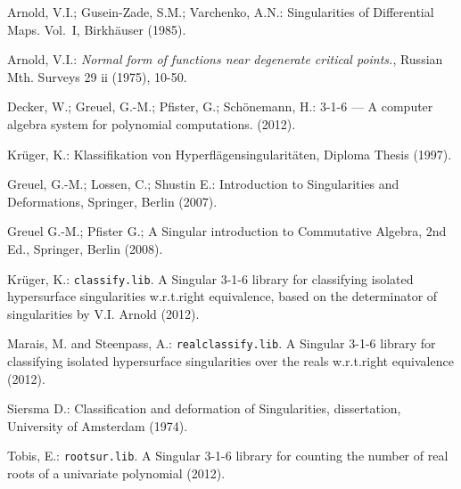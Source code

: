 \documentclass[noend]{amsproc}
\theoremstyle{definition}
\begin{document}
\begin{thebibliography}{99}

Arnold, V.I.; Gusein-Zade, S.M.; Varchenko, A.N.:
Singularities of Differential Maps. Vol.~I, Birkh\"auser (1985).

Arnold, V.I.:
\textit{Normal form of functions near degenerate critical points.},
Russian Mth. Surveys 29 ii (1975), 10-50.

Decker, W.; Greuel, G.-M.; Pfister, G.; Sch{\"o}nemann, H.:
 {3-1-6} --- {A} computer algebra system for polynomial
computations.
 (2012).

Kr\"uger, K.: Klassifikation von
Hyperfl\"agensingularit\"aten, Diploma Thesis (1997).

Greuel, G.-M.; Lossen, C.; Shustin E.:
Introduction to Singularities and Deformations, Springer, Berlin (2007).

Greuel G.-M.; Pfister G.;
A Singular introduction to Commutative Algebra, 2nd Ed., Springer,
Berlin (2008).

Kr\"uger, K.:
{\tt classify.lib}. {A} {\sc Singular} {3-1-6} library for classifying isolated
hypersurface singularities w.r.t.\@ right equivalence, based on the
determinator of singularities by V.I. Arnold (2012).

Marais, M. and Steenpass, A.:
{\tt realclassify.lib}. {A} {\sc Singular} {3-1-6} library for classifying
isolated hypersurface singularities over the reals w.r.t.\@ right equivalence
(2012).

Siersma D.: Classification and deformation of Singularities,
dissertation, University of Amsterdam (1974).

Tobis, E.:
{\tt rootsur.lib}. {A} {\sc Singular} {3-1-6} library for counting the number
of real roots of a univariate polynomial (2012).

\end{thebibliography}
\end{document}
